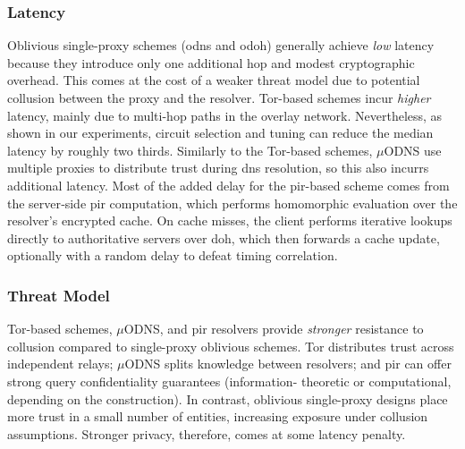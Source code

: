\subsubsection{Latency} Oblivious single-proxy schemes (\ac{odns} and
\ac{odoh}) generally achieve \emph{low} latency because they introduce only one
additional hop and modest cryptographic overhead. This comes at the cost of a
weaker threat model due to potential collusion between the proxy and the
resolver. Tor-based schemes incur \emph{higher} latency, mainly due to
multi-hop paths in the overlay network. Nevertheless, as shown in our
experiments, circuit selection and tuning can reduce the median latency by
roughly two thirds. Similarly to the Tor-based schemes, $\mu$ODNS use multiple
proxies to distribute trust during \ac{dns} resolution, so this also incurrs
additional latency. Most of the added delay for the \ac{pir}-based scheme comes
from the server‑side \ac{pir} computation, which performs homomorphic
evaluation over the resolver's encrypted cache. On cache misses, the client
performs iterative lookups directly to authoritative servers over \ac{doh},
which then forwards a cache update, optionally with a random delay to defeat
timing correlation.

\subsubsection{Threat Model} Tor-based schemes, $\mu$ODNS, and \ac{pir}
resolvers provide \emph{stronger} resistance to collusion compared to
single-proxy oblivious schemes. Tor distributes trust across independent
relays; $\mu$ODNS splits knowledge between resolvers; and \ac{pir} can offer
strong query confidentiality guarantees (information- theoretic or
computational, depending on the construction). In contrast, oblivious
single-proxy designs place more trust in a small number of entities, increasing
exposure under collusion assumptions. Stronger privacy, therefore, comes at
some latency penalty.

